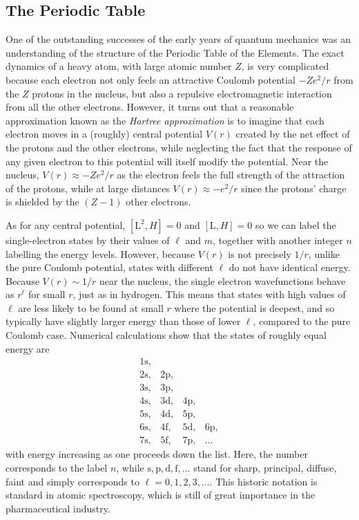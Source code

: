 \documentclass{article}
\theoremstyle{plain}\theoremheaderfont{\normalfont\itshape}\theorembodyfont{\rmfamily}\theoremseparator{.}\newtheorem*{rem}{Remark}\newtheorem*{ex}{Example}\newtheorem*{proof}{Proof}\newtheorem*{altp}{Alternative proof}
\theoremstyle{plain}\theoremheaderfont{\normalfont\bfseries}\theorembodyfont{\rmfamily}\theoremseparator{.}\newtheorem{thm}{Theorem}[section]\newtheorem{lem}[thm]{Lemma}\newtheorem{prop}[thm]{Proposition}\newtheorem*{cor}{Corollary}\newtheorem{defn}[thm]{Definition}\newtheorem{clm}[thm]{Claim}\newtheorem{clminproof}{Claim}
\theoremstyle{break}\theoremheaderfont{\normalfont\itshape}\theorembodyfont{\rmfamily}\theoremseparator{.\medskip}\newtheorem*{proofskip}{Proof}\newtheorem*{exs}{Examples}\newtheorem*{rems}{Remarks}
\theoremstyle{break}\theoremheaderfont{\normalfont\bfseries}\theorembodyfont{\rmfamily}\theoremseparator{.\medskip}\newtheorem{lemskip}[thm]{Lemma}\newtheorem{defnskip}[thm]{Definition}\newtheorem{propskip}[thm]{Proposition}\newtheorem{thmskip}[thm]{Theorem}
\numberwithin{equation}{section}
\newcommand{\vb}[1]{\bm{\mathrm{#1}}}
\begin{document}
    \subsection{The Periodic Table}
    One of the outstanding successes of the early years of quantum mechanics was an understanding of the structure of the Periodic Table of the Elements. The exact dynamics of a heavy atom, with large atomic number \(Z\), is very complicated because each electron not only feels an attractive Coulomb potential \(-Ze^2/r\) from the \(Z\) protons in the nucleus, but also a repulsive electromagnetic interaction from all the other electrons. However, it turns out that a reasonable approximation known as the \textit{Hartree approximation} is to imagine that each electron moves in a (roughly) central potential \(V(r)\) created by the net effect of the protons and the other electrons, while neglecting the fact that the response of any given electron to this potential will itself modify the potential. Near the nucleus, \(V(r)\approx -Ze^2/r\) as the electron feels the full strength of the attraction of the protons, while at large distances \(V(r)\approx -e^2/r\) since the protons' charge is shielded by the \((Z-1)\) other electrons.

    As for any central potential, \([\vb{L}^2,H]=0\) and \([\vb{L},H]=0\) so we can label the single-electron states by their values of \(\ell\) and \(m\), together with another integer \(n\) labelling the energy levels. However, because \(V(r)\) is not precisely \(1/r\), unlike the pure Coulomb potential, states with different \(\ell\) do not have identical energy. Because \(V(r)\sim 1/r\) near the nucleus, the single electron wavefunctions behave as \(r^\ell\) for small \(r\), just as in hydrogen. This means that states with high values of \(\ell\) are less likely to be found at small \(r\) where the potential is deepest, and so typically have slightly larger energy than those of lower \(\ell\), compared to the pure Coulomb case. Numerical calculations show that the states of roughly equal energy are
    \[\begin{array}{llll}
        \mathrm{1s,} \\
        \mathrm{2s,} & \mathrm{2p,} \\
        \mathrm{3s,} & \mathrm{3p,} \\
        \mathrm{4s,} & \mathrm{3d,} & \mathrm{4p,} \\
        \mathrm{5s,} & \mathrm{4d,} & \mathrm{5p,} \\
        \mathrm{6s,} & \mathrm{4f,} & \mathrm{5d,} & \mathrm{6p,} \\
        \mathrm{7s,} & \mathrm{5f,} & \mathrm{7p,} & \mathrm{\dots}
    \end{array}\]
    with energy increasing as one proceeds down the list. Here, the number corresponds to the label \(n\), while \(\mathrm{s,p,d,f,\dots}\) stand for sharp, principal, diffuse, faint and simply corresponds to \(\ell=0,1,2,3,\dots\). This historic notation is standard in atomic spectroscopy, which is still of great importance in the pharmaceutical industry.
\end{document}
